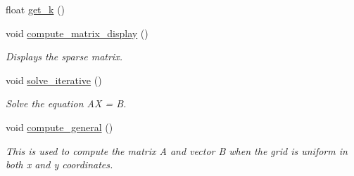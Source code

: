 \begin{DoxyCompactItemize}
float \hyperlink{class_compute_matrix_ac5fb641268db73cc0f376bf40e406d1f}{get\+\_\+k} ()
\item 
void \hyperlink{class_compute_matrix_a1a99ed8437d1922c9f7cdefe9584aba4}{compute\+\_\+matrix\+\_\+display} ()
\begin{DoxyCompactList}\small\item\em Displays the sparse matrix. \end{DoxyCompactList}\item 
void \hyperlink{class_compute_matrix_a4af38192571cbb800f3886083fb84d55}{solve\+\_\+iterative} ()
\begin{DoxyCompactList}\small\item\em Solve the equation A\+X = B. \end{DoxyCompactList}\item 
void \hyperlink{class_compute_matrix_a600edec6b742852a52f32d401bf80886}{compute\+\_\+general} ()
\begin{DoxyCompactList}\small\item\em This is used to compute the matrix A and vector B when the grid is uniform in both x and y coordinates. \end{DoxyCompactList}\end{DoxyCompactItemize}
